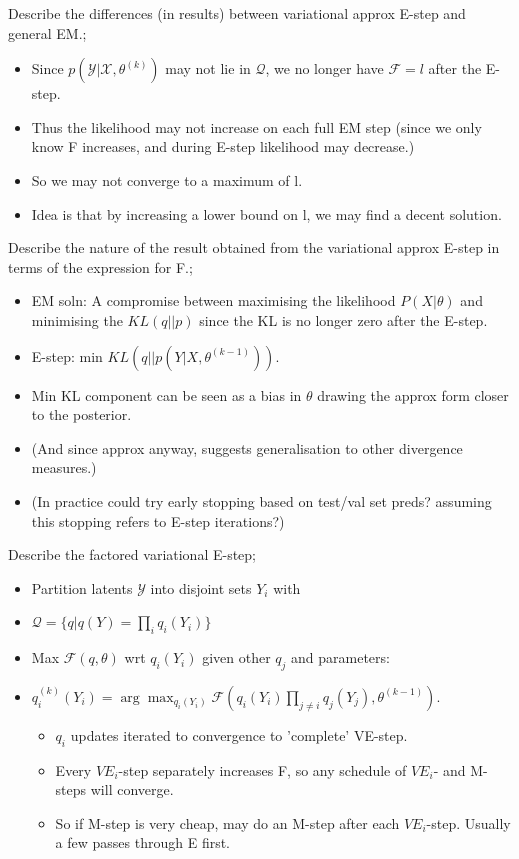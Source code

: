 \documentclass{article}
\begin{document}
Describe the differences (in results) between variational approx E-step and general EM.; \begin{itemize}
	\item Since $p(\mathcal{Y}|\mathcal{X},\theta^{(k)})$ may not lie in $\mathcal{Q}$, we no longer have $\mathcal{F}=l$ after the E-step.
	\item Thus the likelihood may not increase on each full EM step (since we only know F increases, and during E-step likelihood may decrease.)
	\item So we may not converge to a maximum of l.
	\item Idea is that by increasing a lower bound on l, we may find a decent solution.
\end{itemize}

Describe the nature of the result obtained from the variational approx E-step in terms of the expression for F.; \begin{itemize}
	\item EM soln: A compromise between maximising the likelihood $P(X|\theta)$ and minimising the $KL(q||p)$ since the KL is no longer zero after the E-step.
	\item E-step: min $KL(q||p(Y|X,\theta^{(k-1)}))$.
	\item Min KL component can be seen as a bias in $\theta$ drawing the approx form closer to the posterior.
	\item (And since approx anyway, suggests generalisation to other divergence measures.)
	\item (In practice could try early stopping based on test/val set preds? assuming this stopping refers to E-step iterations?)
\end{itemize}

Describe the factored variational E-step; \begin{itemize}
	\item Partition latents $\mathcal{Y}$ into disjoint sets $Y_i$ with 
	\item $\mathcal{Q}=\{q|q(Y)=\prod_i q_i(Y_i)\}$
	\item Max $\mathcal{F}(q,\theta)$ wrt $q_i(Y_i)$ given other $q_j$ and parameters:
	\item $q_i^{(k)}(Y_i)=\arg\max_{q_i(Y_i)}\mathcal{F}(q_i(Y_i)\prod_{j\ne i}q_j(Y_j),\theta^{(k-1)})$.
	\begin{itemize}
		\item $q_i$ updates iterated to convergence to 'complete' VE-step.
		\item Every $VE_i$-step separately increases F, so any schedule of $VE_i$- and M-steps will converge.
		\item So if M-step is very cheap, may do an M-step after each $VE_i$-step. Usually a few passes through E first.
	\end{itemize}
\end{itemize}
\end{document}
